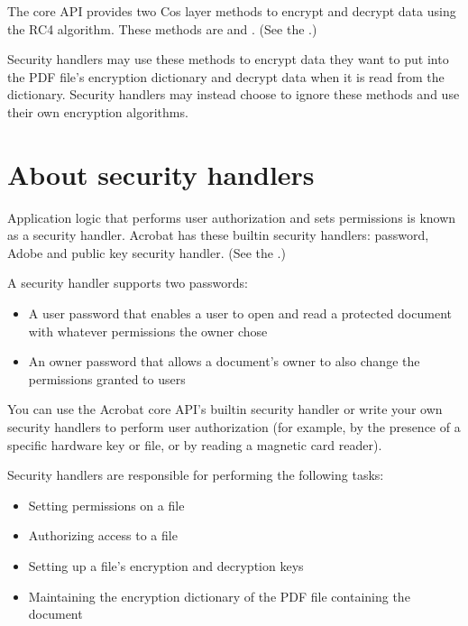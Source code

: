\documentclass[letterpaper,12pt,english,openany,oneside]{sphinxmanual}
\begin{document}
The core API provides two Cos layer methods to encrypt and decrypt data using the RC4 algorithm. These methods are  and . (See the .)

Security handlers may use these methods to encrypt data they want to put into the PDF file’s encryption dictionary and decrypt data when it is read from the dictionary. Security handlers may instead choose to ignore these methods and use their own encryption algorithms.


\section{About security handlers}
\label{\detokenize{Plugins_Security:about-security-handlers}}
Application logic that performs user authorization and sets permissions is known as a security handler. Acrobat has these built\sphinxhyphen{}in security handlers: password, Adobe and public key security handler. (See the .)

A security handler supports two passwords:
\begin{itemize}
\item {} 
A user password that enables a user to open and read a protected document with whatever permissions the owner chose

\item {} 
An owner password that allows a document’s owner to also change the permissions granted to users

\end{itemize}

You can use the Acrobat core API’s built\sphinxhyphen{}in security handler or write your own security handlers to perform user authorization (for example, by the presence of a specific hardware key or file, or by reading a magnetic card reader).

Security handlers are responsible for performing the following tasks:
\begin{itemize}
\item {} 
Setting permissions on a file

\item {} 
Authorizing access to a file

\item {} 
Setting up a file’s encryption and decryption keys

\item {} 
Maintaining the encryption dictionary of the PDF file containing the document

\end{itemize}
\end{document}
